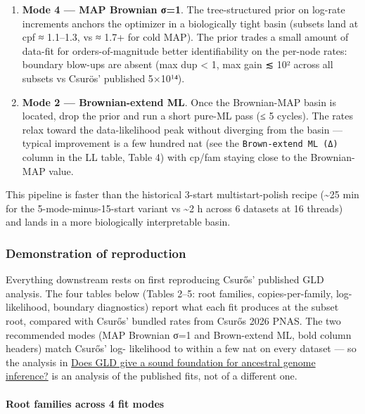 \documentclass[
  10pt,
]{article}
\providecommand{\tightlist}{%
  \setlength{\itemsep}{0pt}\setlength{\parskip}{0pt}}
\begin{document}
\begin{enumerate}
\def\labelenumi{\arabic{enumi}.}
\tightlist
\item
  \textbf{Mode 4 --- MAP Brownian σ=1}. The tree-structured prior on
  log-rate increments anchors the optimizer in a biologically tight
  basin (subsets land at cpf ≈ 1.1--1.3, vs ≈ 1.7+ for cold MAP). The
  prior trades a small amount of data-fit for orders-of-magnitude better
  identifiability on the per-node rates: boundary blow-ups are absent
  (max dup \textless{} 1, max gain ≲ 10² across all subsets vs Csurös'
  published 5×10¹⁴).
\item
  \textbf{Mode 2 --- Brownian-extend ML}. Once the Brownian-MAP basin is
  located, drop the prior and run a short pure-ML pass (≤ 5 cycles). The
  rates relax toward the data-likelihood peak without diverging from the
  basin --- typical improvement is a few hundred nat (see the
  \texttt{Brown-extend\ ML\ (Δ)} column in the LL table, Table 4) with
  cp/fam staying close to the Brownian-MAP value.
\end{enumerate}

This pipeline is faster than the historical 3-start multistart-polish
recipe (\textasciitilde25 min for the 5-mode-minus-15-start variant vs
\textasciitilde2 h across 6 datasets at 16 threads) and lands in a more
biologically interpretable basin.

\subsubsection{Demonstration of
reproduction}\label{demonstration-of-reproduction}

Everything downstream rests on first reproducing Csurős' published GLD
analysis. The four tables below (Tables 2--5: root families,
copies-per-family, log-likelihood, boundary diagnostics) report what
each fit produces at the subset root, compared with Csurős' bundled
rates from Csurős 2026 PNAS. The two recommended modes (MAP Brownian σ=1
and Brown-extend ML, bold column headers) match Csurős' log- likelihood
to within a few nat on every dataset --- so the analysis in
\hyperref[does-gld-give-a-sound-foundation-for-ancestral-genome-inference]{Does
GLD give a sound foundation for ancestral genome inference?} is an
analysis of the published fits, not of a different one.

\paragraph{Root families across 4 fit
modes}\label{root-families-across-4-fit-modes}
\end{document}
